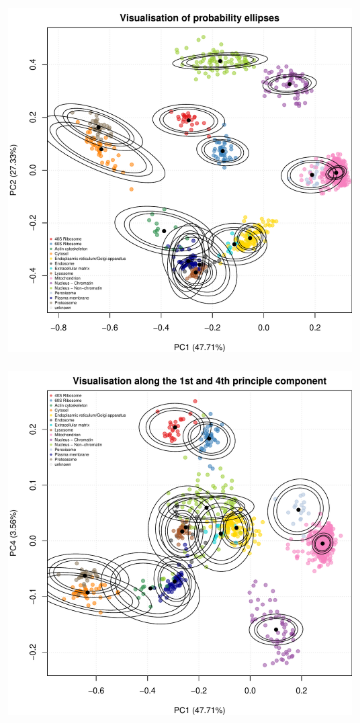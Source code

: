 \documentclass[12pt,english]{article}\usepackage[]{graphicx}\usepackage[]{color}
\makeatletter
\def\maxwidth{ %
  \ifdim\Gin@nat@width>\linewidth
    \linewidth
  \else
    \Gin@nat@width
  \fi
}
\newenvironment{knitrout}{}{} %
\makeatother
\begin{document}
\begin{figure}[ht]
  \begin{subfigure}[t]{0.45\textwidth}
        \centering
\begin{knitrout}
\color{fgcolor}
\includegraphics[width=\maxwidth]{figure/unnamed-chunk-4-1} 

\end{knitrout}
        \caption{}
\end{subfigure}%
\hfill
\begin{subfigure}[t]{0.45\textwidth}
\begin{knitrout}
\color{fgcolor}
\includegraphics[width=\maxwidth]{figure/unnamed-chunk-5-1} 


\end{knitrout}
\end{subfigure}
\end{figure}
\end{document}
